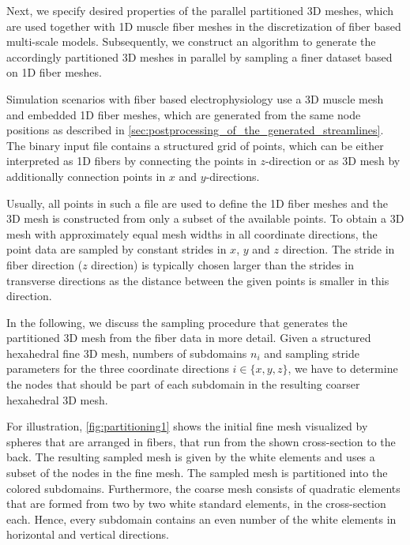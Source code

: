 Next, we specify desired properties of the parallel partitioned 3D meshes, which are used together with 1D muscle fiber meshes in the discretization of fiber based multi-scale models. Subsequently, we construct an algorithm to generate the accordingly partitioned 3D meshes in parallel by sampling a finer dataset based on 1D fiber meshes.

Simulation scenarios with fiber based electrophysiology use a 3D muscle mesh and embedded 1D fiber meshes, which are generated from the same node positions as described in \cref{sec:postprocessing_of_the_generated_streamlines}. The binary input file contains a structured grid of points, which can be either interpreted as 1D fibers by connecting the points in $z$-direction or as 3D mesh by additionally connection points in $x$ and $y$-directions.

Usually, all points in such a file are used to define the 1D fiber meshes and the 3D mesh is constructed from only a subset of the available points. To obtain a 3D mesh with approximately equal mesh widths in all coordinate directions, the point data are sampled by constant strides in $x$, $y$ and $z$ direction.  The stride in fiber direction ($z$ direction) is typically chosen larger than the strides in transverse directions as the distance between the given points is smaller in this direction.

In the following, we discuss the sampling procedure that generates the partitioned 3D mesh from the fiber data in more detail.
Given a structured hexahedral fine 3D mesh, numbers of subdomains $n_i$ and sampling stride parameters  for the three coordinate directions $i\in\{x,y,z\}$, we have to determine the nodes that should be part of each subdomain in the resulting coarser hexahedral 3D mesh. 

For illustration, \cref{fig:partitioning1} shows the initial fine mesh visualized by spheres that are arranged in fibers, that run from the shown cross-section to the back. The resulting sampled mesh is given by the white elements and uses a subset of the nodes in the fine mesh. The sampled mesh is partitioned into the colored subdomains. 
Furthermore, the coarse mesh consists of quadratic elements that are formed from two by two white standard elements, in the cross-section each. Hence, every subdomain contains an even number of the white elements in horizontal and vertical directions.


